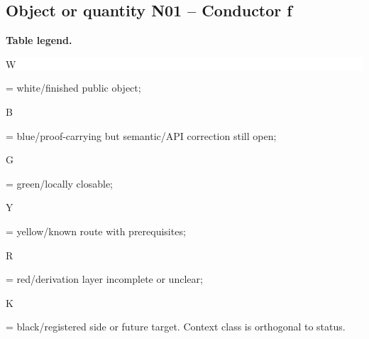 \subsection*{Object or quantity N01 -- Conductor f}
\hypertarget{objproof:N01}{}
\par\smallskip\noindent\begin{minipage}{0.99\linewidth}\footnotesize\raggedright\textbf{Table legend.} \colorbox{white}{\strut W} = white/finished public object; \colorbox{cyan!20}{\strut B} = blue/proof-carrying but semantic/API correction still open; \colorbox{green!18}{\strut G} = green/locally closable; \colorbox{yellow!25}{\strut Y} = yellow/known route with prerequisites; \colorbox{red!20}{\strut R} = red/derivation layer incomplete or unclear; \colorbox{black!18}{\strut K} = black/registered side or future target. Context class is orthogonal to status.\end{minipage}\par\vspace{0.25em}
